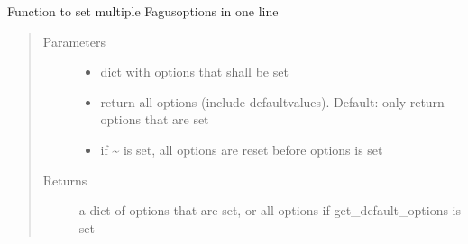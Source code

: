\documentclass[a4paper,10pt,english]{sphinxmanual}
\begin{document}
\begin{fulllineitems}
\begin{fulllineitems}
\label{\detokenize{fagus:fagus.Fagus.options}}
\pysigstartsignatures
{}
\pysigstopsignatures
\sphinxAtStartPar
Function to set multiple Fagus\sphinxhyphen{}options in one line
\begin{quote}\begin{description}
\item[{Parameters}] \leavevmode\begin{itemize}
\item {}
\sphinxAtStartPar
{} \textendash{} dict with options that shall be set

\item {}
\sphinxAtStartPar
{} \textendash{} return all options (include default\sphinxhyphen{}values). Default: only return options that are set

\item {}
\sphinxAtStartPar
{} \textendash{} if \textasciitilde{} is set, all options are reset before options is set

\end{itemize}

\item[{Returns}] \leavevmode
\sphinxAtStartPar
a dict of options that are set, or all options if get\_default\_options is set

\end{description}\end{quote}

\end{fulllineitems}



\end{fulllineitems}
\end{document}
